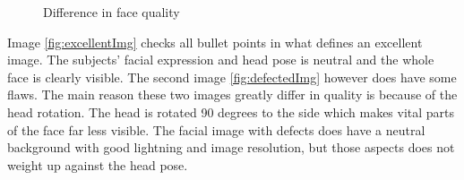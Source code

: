 \begin{figure}[h]
\centering
    \caption{Difference in face quality}
\end{figure}

Image \ref{fig:excellentImg} checks all bullet points in what defines an excellent image. The subjects' facial expression and head pose is neutral and the whole face is clearly visible. The second image \ref{fig:defectedImg} however does have some flaws. The main reason these two images greatly differ in quality is because of the head rotation. The head is rotated 90 degrees to the side which makes vital parts of the face far less visible. The facial image with defects does have a neutral background with good lightning and image resolution, but those aspects does not weight up against the head pose.

